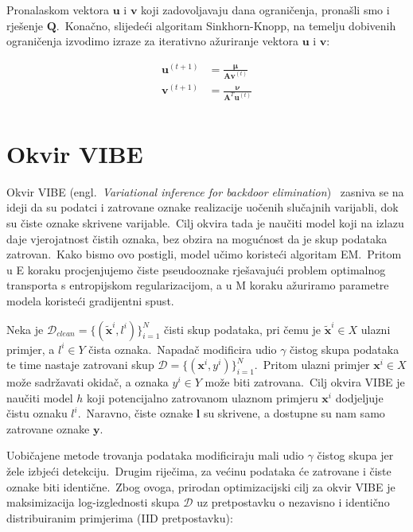 \documentclass[diplomskirad]{fer}
\begin{document}
Pronalaskom vektora $\bm{u}$ i $\bm{v}$ koji zadovoljavaju dana ograničenja, pronašli smo i rješenje $\bm{Q}$.\ Konačno, slijedeći algoritam Sinkhorn-Knopp, na temelju dobivenih ograničenja izvodimo izraze za iterativno ažuriranje vektora $\bm{u}$ i $\bm{v}$:

\begin{equation}
  \begin{aligned}
    \bm{u}^{(t + 1)} &= \frac{\bm{\mu}}{\bm{A} \bm{v}^{(t)}} \\
    \bm{v}^{(t + 1)} &= \frac{\bm{\nu}}{\bm{A}^T \bm{u}^{(t)}} \\
  \end{aligned}
  \label{eq:sk_final}
\end{equation}

\chapter{Okvir VIBE}
\label{pog:vibe}

Okvir VIBE (engl.\ \textit{Variational inference for backdoor elimination})~\cite{sabolic2025seal} zasniva se na ideji da su podatci i zatrovane oznake realizacije uočenih slučajnih varijabli, dok su čiste oznake skrivene varijable.\ 
Cilj okvira tada je naučiti model koji na izlazu daje vjerojatnost čistih oznaka, bez obzira na mogućnost da je skup podataka zatrovan.\ Kako bismo ovo postigli, model učimo koristeći algoritam EM.\ 
Pritom u E koraku procjenjujemo čiste pseudooznake rješavajući problem optimalnog transporta s entropijskom regularizacijom, a u M koraku ažuriramo parametre modela koristeći gradijentni spust.\ 

Neka je $\mathcal{D}_{clean} = \{(\bm{\tilde{x}}^i, l^i)\}_{i=1}^{N}$ čisti skup podataka, pri čemu je $\bm{\tilde{x}}^i \in X$ ulazni primjer, a $l^i \in Y$ čista oznaka.\ 
Napadač modificira udio $\gamma$ čistog skupa podataka te time nastaje zatrovani skup $\mathcal{D} = \{(\bm{x}^i, y^i)\}_{i=1}^{N}$.\ Pritom ulazni primjer $\bm{x}^i \in X$ može sadržavati okidač, a oznaka $y^i \in Y$ može biti zatrovana.\ 
Cilj okvira VIBE je naučiti model $h$ koji potencijalno zatrovanom ulaznom primjeru $\bm{x}^i$ dodjeljuje čistu oznaku $l^i$.\ 
Naravno, čiste oznake $\bm{l}$ su skrivene, a dostupne su nam samo zatrovane oznake $\bm{y}$.\ 

Uobičajene metode trovanja podataka modificiraju mali udio $\gamma$ čistog skupa jer žele izbjeći detekciju.\ Drugim riječima, za većinu podataka će zatrovane i čiste oznake biti identične.\
Zbog ovoga, prirodan optimizacijski cilj za okvir VIBE je maksimizacija log-izglednosti skupa $\mathcal{D}$ uz pretpostavku o nezavisno i identično distribuiranim primjerima (IID pretpostavku):
\end{document}

